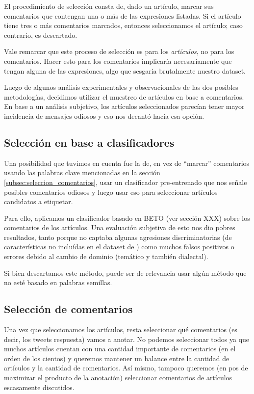El procedimiento de selección consta de, dado un artículo, marcar sus comentarios que contengan una o más de las expresiones listadas. Si el artículo tiene tres o más comentarios marcados, entonces seleccionamos el artículo; caso contrario, es descartado.

Vale remarcar que este proceso de selección es para los \emph{artículos}, no para los comentarios. Hacer esto para los comentarios implicaría necesariamente que tengan alguna de las expresiones, algo que sesgaría brutalmente nuestro dataset.


Luego de algunos análisis experimentales y observacionales de las dos posibles metodologías, decidimos utilizar el muestreo de artículos en base a comentarios. En base a un análisis subjetivo, los artículos seleccionados parecían tener mayor incidencia de mensajes odiosos y eso nos decantó hacia esa opción.

\subsection{Selección en base a clasificadores}

Una posibilidad que tuvimos en cuenta fue la de, en vez de ``marcar'' comentarios usando las palabras clave mencionadas en la sección \ref{subsec:seleccion_comentarios}, usar un clasificador pre-entrenado que nos señale posibles comentarios odiosos y luego usar eso para seleccionar artículos candidatos a etiquetar.

Para ello, aplicamos un clasificador basado en BETO \citet{canete2020spanish} (ver sección XXX) sobre los comentarios de los artículos. Una evaluación subjetiva de esto nos dio pobres resultados, tanto porque no captaba algunas agresiones discriminatorias (de características no incluídas en el dataset de \citet{hateval2019semeval}) como muchos falsos positivos o errores debido al cambio de dominio (temático y también dialectal).

Si bien descartamos este método, puede ser de relevancia usar algún método que no esté basado en palabras semillas.


\subsection{Selección de comentarios}

Una vez que seleccionamos los artículos, resta seleccionar qué comentarios (es decir, los tweets respuesta) vamos a anotar. No podemos seleccionar todos ya que muchos artículos cuentan con una cantidad importante de comentarios (en el orden de los cientos) y queremos mantener un balance entre la cantidad de artículos y la cantidad de comentarios. Así mismo, tampoco queremos (en pos de maximizar el producto de la anotación) seleccionar comentarios de artículos escasamente discutidos.

